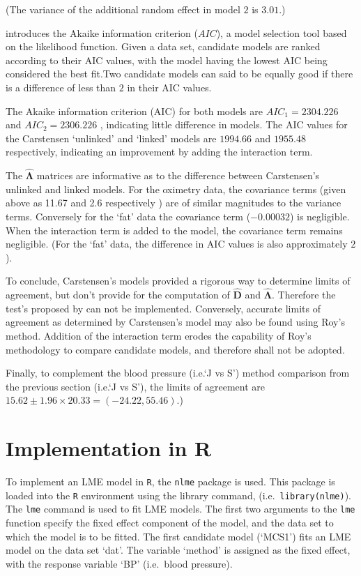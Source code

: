 \documentclass[12pt, a4paper]{article}
\theoremstyle{plain}
\theoremstyle{definition}
\theoremstyle{remark}
\begin{document}
\noindent (The variance of the additional random effect in model $2$ is $3.01$.)

\citet{akaike} introduces the Akaike information criterion ($AIC$), a model
selection tool based on the likelihood function. Given a data set, candidate models
are ranked according to their AIC values, with the model having the lowest AIC being considered the best fit.Two candidate models can said to be equally good if there is a difference of less than $2$ in their AIC values.

The Akaike information criterion (AIC) for both models are $AIC_{1} = 2304.226$ and $AIC_{2} = 2306.226$ , indicating little difference in models. The AIC values for the Carstensen `unlinked' and `linked' models are $1994.66$ and $1955.48$ respectively, indicating an improvement by adding the interaction term.

The $\boldsymbol{\hat{\Lambda}}$ matrices are informative as to the difference between Carstensen's unlinked and linked models. For the oximetry data, the covariance terms (given above as 11.67 and 2.6 respectively ) are of similar magnitudes to the variance terms. Conversely for the `fat' data the covariance term ($-0.00032$) is negligible. When the interaction term is added to the model, the covariance term remains negligible. (For the `fat' data, the difference in AIC values is also approximately $2$).

To conclude, Carstensen's models provided a rigorous way to determine limits of agreement, but don't provide for the computation of $\boldsymbol{\hat{D}}$ and $\boldsymbol{\hat{\Lambda}}$. Therefore the test's proposed by \citet{roy} can not be implemented. Conversely, accurate limits of agreement as determined by Carstensen's model may also be found using Roy's method. Addition of the interaction term erodes the capability of Roy's methodology to compare candidate models, and therefore shall not be adopted.

Finally, to complement the blood pressure (i.e.`J vs S') method comparison from the previous section (i.e.`J vs S'), the limits of agreement are $15.62 \pm 1.96 \times 20.33 = (-24.22, 55.46)$.)
\newpage
\section{Implementation in R}
To implement an LME model in \texttt{R}, the \texttt{nlme} package is used. This package is loaded into the \texttt{R} environment using the library command, (i.e.\ \texttt{library(nlme)}). The \texttt{lme} command is used to fit LME models. The first two arguments to the \texttt{lme} function specify the fixed effect component of the model, and the data set to which the model is to be fitted. The first candidate model (`MCS1') fits an LME model on the data set `dat'. The variable `method' is assigned as the fixed effect, with the response variable `BP' (i.e.\ blood pressure).
\end{document}
